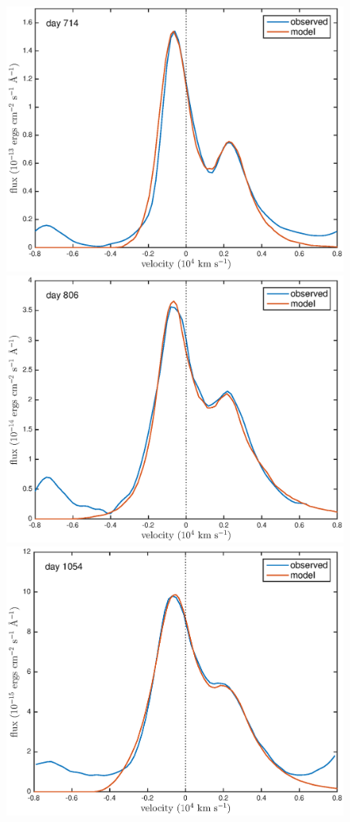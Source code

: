 \documentclass[useAMS,usenatbib,usegraphicx]{mnras}
\begin{document}
\begin{figure}
\begin{center}

\includegraphics[trim =37 10 45 15,clip=true,scale=0.41]{smooth/best_fit/d714OI}
\includegraphics[trim =37 10 45 15,clip=true,scale=0.41]{smooth/best_fit/d806OI}
\includegraphics[trim =37 10 45 15,clip=true,scale=0.41]{smooth/best_fit/d1054OI}

\end{center}
\end{figure}
\end{document}
